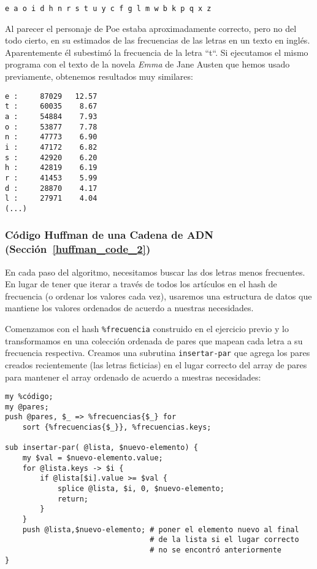 \begin{verbatim}
e a o i d h n r s t u y c f g l m w b k p q x z
\end{verbatim}

Al parecer el personaje de Poe estaba aproximadamente correcto,
pero no del todo cierto, en su estimados de las frecuencias
de las letras en un texto en inglés. Aparentemente él subestimó
la frecuencia de la letra ``t``. Si ejecutamos el mismo programa
con el texto de la novela \emph{Emma} de Jane Austen que hemos usado
previamente, obtenemos resultados muy similares:

\begin{verbatim}
e :     87029   12.57
t :     60035    8.67
a :     54884    7.93
o :     53877    7.78
n :     47773    6.90
i :     47172    6.82
s :     42920    6.20
h :     42819    6.19
r :     41453    5.99
d :     28870    4.17
l :     27971    4.04
(...)
\end{verbatim}

\subsubsection{Código Huffman de una Cadena de ADN (Sección~\ref{huffman_code_2})}
\label{sol_huffman_code_2}

En cada paso del algoritmo, necesitamos buscar las dos letras
menos frecuentes. En lugar de tener que iterar a través de todos
los artículos en el hash de frecuencia (o ordenar los valores 
cada vez), usaremos una estructura de datos que mantiene los
valores ordenados de acuerdo a nuestras necesidades.

Comenzamos con el hash \verb|%frecuencia| construido en el ejercicio
previo y lo transformamos en una colección ordenada de pares que
mapean cada letra a su frecuencia respectiva. Creamos una subrutina
{\tt insertar-par} que agrega los pares creados recientemente (las letras ficticias)
en el lugar correcto del array de pares para mantener el array ordenado
de acuerdo a nuestras necesidades:


\begin{verbatim}
my %código;
my @pares;
push @pares, $_ => %frecuencias{$_} for 
    sort {%frecuencias{$_}}, %frecuencias.keys;

sub insertar-par( @lista, $nuevo-elemento) {
    my $val = $nuevo-elemento.value;
    for @lista.keys -> $i {
        if @lista[$i].value >= $val {
            splice @lista, $i, 0, $nuevo-elemento;
            return;
        }
    }
    push @lista,$nuevo-elemento; # poner el elemento nuevo al final
                                 # de la lista si el lugar correcto
                                 # no se encontró anteriormente
}
\end{verbatim}

